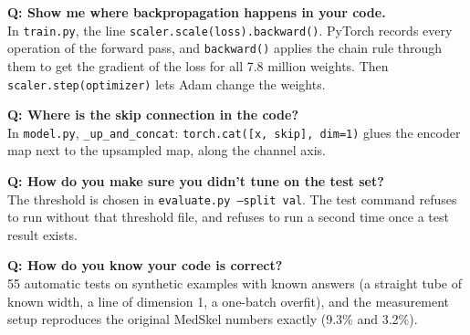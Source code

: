 \begin{prof}\textbf{Q: Show me where backpropagation happens in your code.}\\
In \texttt{train.py}, the line \texttt{scaler.scale(loss).backward()}. PyTorch records every operation of the forward pass, and \texttt{backward()} applies the chain rule through them to get the gradient of the loss for all 7.8 million weights. Then \texttt{scaler.step(optimizer)} lets Adam change the weights.\end{prof}

\begin{prof}\textbf{Q: Where is the skip connection in the code?}\\
In \texttt{model.py}, \texttt{\_up\_and\_concat}: \texttt{torch.cat([x, skip], dim=1)} glues the encoder map next to the upsampled map, along the channel axis.\end{prof}

\begin{prof}\textbf{Q: How do you make sure you didn't tune on the test set?}\\
The threshold is chosen in \texttt{evaluate.py --split val}. The test command refuses to run without that threshold file, and refuses to run a second time once a test result exists.\end{prof}

\begin{prof}\textbf{Q: How do you know your code is correct?}\\
55 automatic tests on synthetic examples with known answers (a straight tube of known width, a line of dimension 1, a one-batch overfit), and the measurement setup reproduces the original MedSkel numbers exactly (9.3\% and 3.2\%).\end{prof}

